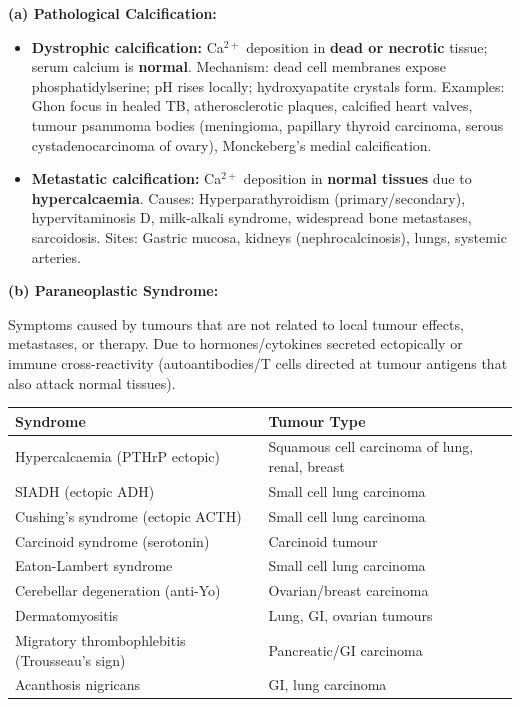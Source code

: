 \documentclass[11pt,a4paper]{article}
\begin{document}
\begin{ansbox}
\textbf{(a) Pathological Calcification:}

\begin{itemize}[leftmargin=*]
    \item \textbf{Dystrophic calcification:} Ca$^{2+}$ deposition in \textbf{dead or necrotic} tissue; serum calcium is \textbf{normal}. Mechanism: dead cell membranes expose phosphatidylserine; pH rises locally; hydroxyapatite crystals form. Examples: Ghon focus in healed TB, atherosclerotic plaques, calcified heart valves, tumour psammoma bodies (meningioma, papillary thyroid carcinoma, serous cystadenocarcinoma of ovary), Monckeberg's medial calcification.
    \item \textbf{Metastatic calcification:} Ca$^{2+}$ deposition in \textbf{normal tissues} due to \textbf{hypercalcaemia}. Causes: Hyperparathyroidism (primary/secondary), hypervitaminosis D, milk-alkali syndrome, widespread bone metastases, sarcoidosis. Sites: Gastric mucosa, kidneys (nephrocalcinosis), lungs, systemic arteries.
\end{itemize}

\textbf{(b) Paraneoplastic Syndrome:}

Symptoms caused by tumours that are not related to local tumour effects, metastases, or therapy. Due to hormones/cytokines secreted ectopically or immune cross-reactivity (autoantibodies/T cells directed at tumour antigens that also attack normal tissues).

\begin{center}
\begin{tabular}{ll}
\toprule
\textbf{Syndrome} & \textbf{Tumour Type} \\
\midrule
Hypercalcaemia (PTHrP ectopic) & Squamous cell carcinoma of lung, renal, breast \\
SIADH (ectopic ADH) & Small cell lung carcinoma \\
Cushing's syndrome (ectopic ACTH) & Small cell lung carcinoma \\
Carcinoid syndrome (serotonin) & Carcinoid tumour \\
Eaton-Lambert syndrome & Small cell lung carcinoma \\
Cerebellar degeneration (anti-Yo) & Ovarian/breast carcinoma \\
Dermatomyositis & Lung, GI, ovarian tumours \\
Migratory thrombophlebitis (Trousseau's sign) & Pancreatic/GI carcinoma \\
Acanthosis nigricans & GI, lung carcinoma \\
\bottomrule
\end{tabular}
\end{center}


\end{ansbox}
\end{document}
